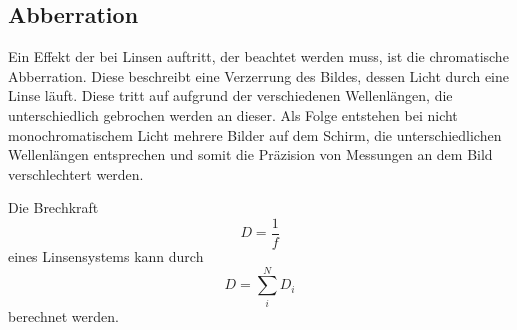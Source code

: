 \subsection{Abberration}
    \noindent Ein Effekt der bei Linsen auftritt, der beachtet werden muss, ist die chromatische Abberration. Diese beschreibt eine Verzerrung des Bildes, dessen Licht durch eine Linse läuft. Diese tritt auf aufgrund der verschiedenen Wellenlängen, die unterschiedlich gebrochen werden an dieser.
    Als Folge entstehen bei nicht monochromatischem Licht mehrere Bilder auf dem Schirm, die unterschiedlichen Wellenlängen entsprechen und somit die Präzision von Messungen an dem Bild verschlechtert werden.

    \noindent Die Brechkraft
    \begin{equation}
        \label{eqn.Brechkraft}
        D=\frac{1}{f}
    \end{equation}
    eines Linsensystems kann durch
    \begin{equation}
        D=\sum_i^N{D_i}
        \label{Brechkraft2}
    \end{equation}
    berechnet werden.

    \cite{V408}

